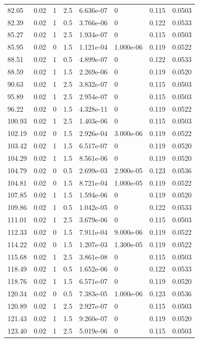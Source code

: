 \documentclass[preview]{standalone}
\begin{document}
{{{\begin{tabular}{L{1.2cm}C{1.2cm} C{0.3cm}C{0.5cm} C{1.4cm}C{1.4cm} C{1.4cm}C{1.4cm}}
  82.05  &  0.02  & 1     & 2.5 &  6.636e-07  & 0  & 0.115 &  0.0503   \\ 
  82.39  &  0.02  & 1     & 0.5 &  3.766e-06  & 0  & 0.122 &  0.0533   \\ 
  85.27  &  0.02  & 1     & 2.5 &  1.934e-07  & 0  & 0.115 &  0.0503   \\ 
  85.95  &  0.02  & 0     & 1.5 &  1.121e-04  & 1.000e-06  & 0.119 &  0.0522   \\ 
  88.51  &  0.02  & 1     & 0.5 &  4.899e-07  & 0  & 0.122 &  0.0533   \\ 
  88.59  &  0.02  & 1     & 1.5 &  2.269e-06  & 0  & 0.119 &  0.0520   \\ 
  90.63  &  0.02  & 1     & 2.5 &  3.832e-07  & 0  & 0.115 &  0.0503   \\ 
  95.89  &  0.02  & 1     & 2.5 &  2.954e-07  & 0  & 0.115 &  0.0503   \\ 
  96.22  &  0.02  & 0     & 1.5 &  4.328e-11  & 0  & 0.119 &  0.0522   \\ 
  100.93  &  0.02  & 1     & 2.5 &  1.403e-06  & 0  & 0.115 &  0.0503   \\ 
  102.19  &  0.02  & 0     & 1.5 &  2.926e-04  & 3.000e-06  & 0.119 &  0.0522   \\ 
  103.42  &  0.02  & 1     & 1.5 &  6.517e-07  & 0  & 0.119 &  0.0520   \\ 
  104.29  &  0.02  & 1     & 1.5 &  8.561e-06  & 0  & 0.119 &  0.0520   \\ 
  104.79  &  0.02  & 0     & 0.5 &  2.699e-03  & 2.900e-05  & 0.123 &  0.0536   \\ 
  104.81  &  0.02  & 0     & 1.5 &  8.721e-04  & 1.000e-05  & 0.119 &  0.0522   \\ 
  107.85  &  0.02  & 1     & 1.5 &  1.594e-06  & 0  & 0.119 &  0.0520   \\ 
  109.86  &  0.02  & 1     & 0.5 &  1.042e-05  & 0  & 0.122 &  0.0533   \\ 
  111.01  &  0.02  & 1     & 2.5 &  3.679e-06  & 0  & 0.115 &  0.0503   \\ 
  112.33  &  0.02  & 0     & 1.5 &  7.911e-04  & 9.000e-06  & 0.119 &  0.0522   \\ 
  114.22  &  0.02  & 0     & 1.5 &  1.207e-03  & 1.300e-05  & 0.119 &  0.0522   \\ 
  115.68  &  0.02  & 1     & 2.5 &  3.861e-08  & 0  & 0.115 &  0.0503   \\ 
  118.49  &  0.02  & 1     & 0.5 &  1.652e-06  & 0  & 0.122 &  0.0533   \\ 
  118.76  &  0.02  & 1     & 1.5 &  6.571e-07  & 0  & 0.119 &  0.0520   \\ 
  120.34  &  0.02  & 0     & 0.5 &  7.383e-05  & 1.000e-06  & 0.123 &  0.0536   \\ 
  120.89  &  0.02  & 1     & 2.5 &  2.927e-07  & 0  & 0.115 &  0.0503   \\ 
  121.43  &  0.02  & 1     & 1.5 &  9.260e-07  & 0  & 0.119 &  0.0520   \\ 
  123.40  &  0.02  & 1     & 2.5 &  5.019e-06  & 0  & 0.115 &  0.0503   \\ 
\hline 
\end{tabular} 

}}}
\end{document}
